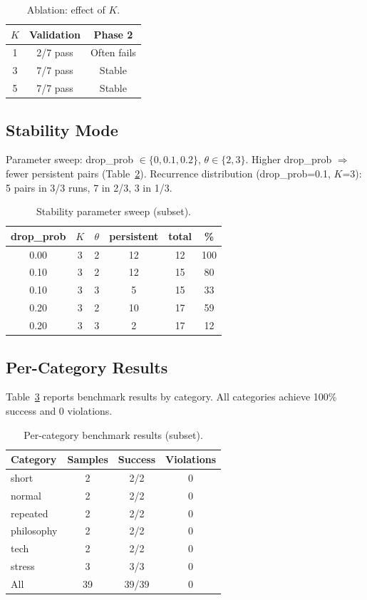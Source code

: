 \documentclass[10pt]{article}
\begin{document}
\begin{table}[t]
\centering
\caption{Ablation: effect of $K$.}
\label{tab:ablation}
\begin{tabular}{ccc}
\toprule
$K$ & Validation & Phase 2 \\
\midrule
1 & 2/7 pass & Often fails \\
3 & 7/7 pass & Stable \\
5 & 7/7 pass & Stable \\
\bottomrule
\end{tabular}
\end{table}

\subsection{Stability Mode}

Parameter sweep: drop\_prob $\in \{0, 0.1, 0.2\}$, $\theta \in \{2, 3\}$. Higher drop\_prob $\Rightarrow$ fewer persistent pairs (Table~\ref{tab:stability}). Recurrence distribution (drop\_prob=0.1, $K$=3): 5 pairs in 3/3 runs, 7 in 2/3, 3 in 1/3.

\begin{table}[t]
\centering
\caption{Stability parameter sweep (subset).}
\label{tab:stability}
\begin{tabular}{cccccc}
\toprule
\textbf{drop\_prob} & \textbf{$K$} & \textbf{$\theta$} & \textbf{persistent} & \textbf{total} & \textbf{\%} \\
\midrule
0.00 & 3 & 2 & 12 & 12 & 100 \\
0.10 & 3 & 2 & 12 & 15 & 80 \\
0.10 & 3 & 3 & 5 & 15 & 33 \\
0.20 & 3 & 2 & 10 & 17 & 59 \\
0.20 & 3 & 3 & 2 & 17 & 12 \\
\bottomrule
\end{tabular}
\end{table}

\subsection{Per-Category Results}

Table~\ref{tab:percat} reports benchmark results by category. All categories achieve 100\% success and 0 violations.

\begin{table}[t]
\centering
\caption{Per-category benchmark results (subset).}
\label{tab:percat}
\begin{tabular}{lccc}
\toprule
\textbf{Category} & \textbf{Samples} & \textbf{Success} & \textbf{Violations} \\
\midrule
short & 2 & 2/2 & 0 \\
normal & 2 & 2/2 & 0 \\
repeated & 2 & 2/2 & 0 \\
philosophy & 2 & 2/2 & 0 \\
tech & 2 & 2/2 & 0 \\
stress & 3 & 3/3 & 0 \\
\midrule
All & 39 & 39/39 & 0 \\
\bottomrule
\end{tabular}
\end{table}
\end{document}
